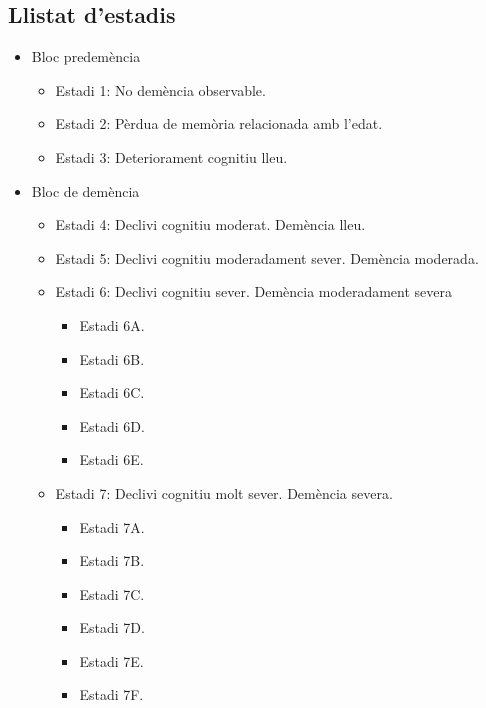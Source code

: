 \documentclass[a4paper,12pt]{report}
\begin{document}
\subsection*{Llistat d'estadis}
\begin{itemize}
    \item Bloc predemència
    \begin{itemize}
        \item Estadi 1: No demència observable.
        \item Estadi 2: Pèrdua de memòria relacionada amb l'edat.
        \item Estadi 3: Deteriorament cognitiu lleu.
    \end{itemize}
    \item Bloc de demència
    \begin{itemize}
        \item Estadi 4: Declivi cognitiu moderat. Demència lleu.
        \item Estadi 5: Declivi cognitiu moderadament sever. Demència moderada.
        \item Estadi 6: Declivi cognitiu sever. Demència moderadament severa
        \begin{itemize}
            \item Estadi 6A.
            \item Estadi 6B.
            \item Estadi 6C.
            \item Estadi 6D.
            \item Estadi 6E.
        \end{itemize}
        \item Estadi 7: Declivi cognitiu molt sever. Demència severa.
        \begin{itemize}
            \item Estadi 7A.
            \item Estadi 7B.
            \item Estadi 7C.
            \item Estadi 7D.
            \item Estadi 7E.
            \item Estadi 7F.
        \end{itemize}
    \end{itemize}
\end{itemize}
\end{document}
